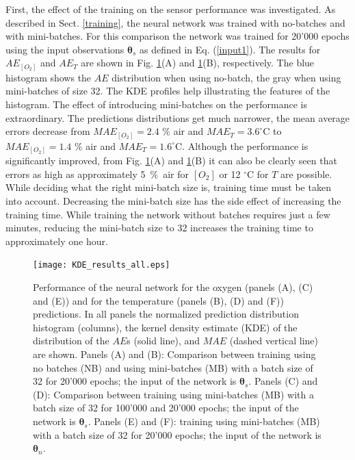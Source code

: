 \documentclass[9pt,twocolumn,twoside,pdftex]{optica}
\begin{document}
First, the effect of the training on the sensor performance was investigated. As described in Sect. \ref{training}, the neural network was trained with no-batches and with mini-batches. For this comparison the network was trained for 20'000 epochs using the input observations ${\pmb \theta}_s$ as defined in Eq. (\ref{input1}). The results for $AE_{[O_2]}$ and $AE_T$ are shown in Fig. \ref{fig:KDE_results_all}(A) and \ref{fig:KDE_results_all}(B), respectively. The blue histogram shows the $AE$ distribution when using no-batch, the gray when using mini-batches of size 32. The KDE profiles help illustrating the features of the histogram. The effect of introducing mini-batches on the performance is extraordinary. The predictions distributions get much narrower, the mean average errors decrease from $MAE_{[O_2]}=2.4$ \% air and $MAE_{T}=3.6^\circ$C to $MAE_{[O_2]}=1.4$ \% air and $MAE_{T}=1.6^\circ$C. Although the performance is significantly improved, from Fig. \ref{fig:KDE_results_all}(A) and \ref{fig:KDE_results_all}(B) it can also be clearly seen that errors as high as approximately 5~\%~air for $[O_2]$ or 12 $^\circ$C for $T$ are possible. While deciding what the right mini-batch size is, training time must be taken into account. Decreasing the mini-batch size has the side effect of increasing the training time. While training the network without batches requires just a few minutes, reducing the mini-batch size to 32 increases the training time to approximately one hour.

\begin{figure}[htbp]
\centering
\texttt{[image: KDE\_results\_all.eps]}
\caption{Performance of the neural network for the oxygen (panels (A), (C) and (E)) and for the temperature (panels (B), (D) and (F)) predictions. In all panels the normalized prediction distribution histogram (columns), the kernel density estimate (KDE) of the distribution of the $AE$s (solid line), and $MAE$ (dashed vertical line) are shown. Panels (A) and (B): Comparison between training using no batches (NB) and using mini-batches (MB) with a batch size of 32 for 20'000 epochs; the input of the network is ${\pmb \theta}_s$. Panels (C) and (D): Comparison between training using mini-batches (MB) with a batch size of 32 for 100'000 and 20'000 epochs; the input of the network is ${\pmb \theta}_s$. Panels (E) and (F): 
training using mini-batches (MB) with a batch size of 32 for 20'000 epochs; the input of the network is ${\pmb \theta}_n$.}
\label{fig:KDE_results_all}
\end{figure}
\end{document}
